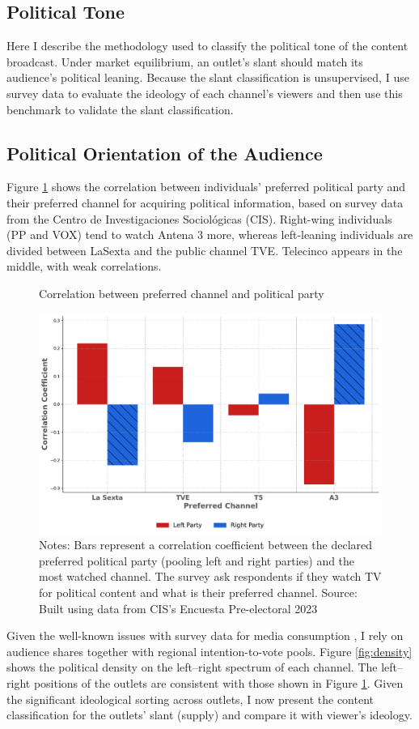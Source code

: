 \documentclass[12pt]{article}
\begin{document}
	
	\subsection{Political Tone}
	
	\label{sec:classification}
	
	Here I describe the methodology used to classify the political tone of the content broadcast. Under market equilibrium, an outlet's slant should match its audience's political leaning. Because the slant classification is unsupervised, I use survey data to evaluate the ideology of each channel's viewers and then use this benchmark to validate the slant classification.
	
	\subsection*{Political Orientation of the Audience}
	
	Figure \ref{fig:opinion} shows the correlation between individuals' preferred political party and their preferred channel for acquiring political information, based on survey data from the Centro de Investigaciones Sociológicas (CIS). Right-wing individuals (PP and VOX) tend to watch Antena 3 more, whereas left-leaning individuals are divided between LaSexta and the public channel TVE. Telecinco appears in the middle, with weak correlations.
	
	
	\begin{figure}[h!]
		\centering
		\caption{Correlation between preferred channel and political party}
		\includegraphics[width=120mm]{figures/corr_party_channel3}
		\caption*{\small Notes:  Bars represent a correlation coefficient between the declared preferred political party (pooling left and right parties) and the most watched channel. The survey ask respondents if they watch TV for political content and what is their preferred channel. Source: Built using data from CIS's Encuesta Pre-electoral 2023 }
		\label{fig:opinion}
	\end{figure}
	Given the well-known issues with survey data for media consumption \citep{prior}, I rely on audience shares together with regional intention-to-vote pools. Figure \ref{fig:density} shows the political density on the left–right spectrum of each channel. The left–right positions of the outlets are consistent with those shown in Figure \ref{fig:opinion}. Given the significant ideological sorting across outlets, I now present the content classification for the outlets’ slant (supply) and compare it with viewer's ideology. 
	
\end{document}
